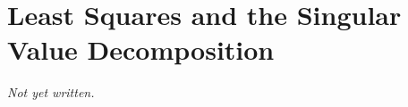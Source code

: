 \chapter{Least Squares and the Singular Value Decomposition}\label{ch:least-squares-svd}


\textit{Not yet written.}
